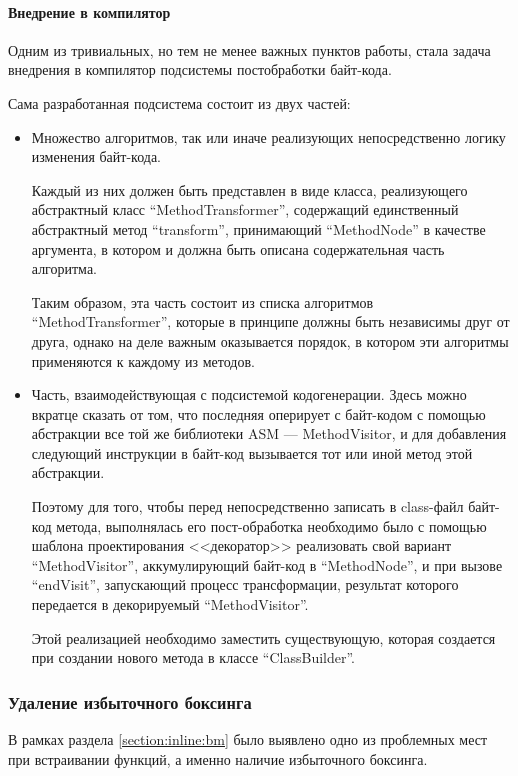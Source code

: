 \paragraph{Внедрение в компилятор}
Одним из тривиальных, но тем не менее важных пунктов работы, стала задача внедрения в компилятор
подсистемы постобработки байт-кода.

Сама разработанная подсистема состоит из двух частей:
\begin{itemize}
    \item Множество алгоритмов, так или иначе реализующих непосредственно логику изменения
    байт-кода.

    Каждый из них должен быть представлен в виде класса, реализующего абстрактный класс
    ``MethodTransformer'', содержащий единственный абстрактный метод ``transform'', принимающий
    ``MethodNode'' в качестве аргумента, в котором и должна быть описана содержательная часть
    алгоритма.

    Таким образом, эта часть состоит из списка алгоритмов ``MethodTransformer'', которые в принципе
    должны быть независимы друг от друга, однако на деле важным оказывается порядок, в котором
    эти алгоритмы применяются к каждому из методов.

    \item Часть, взаимодействующая с подсистемой кодогенерации.
    Здесь можно вкратце сказать от том, что последняя оперирует с байт-кодом с помощью абстракции
    все той же библиотеки ASM --- MethodVisitor, и для добавления следующий инструкции в байт-код
    вызывается тот или иной метод этой абстракции.

    Поэтому для того, чтобы перед непосредственно записать в class-файл байт-код метода,
    выполнялась его пост-обработка необходимо было с помощью шаблона проектирования
    <<декоратор>>\cite{Gamma} реализовать свой вариант ``MethodVisitor'', аккумулирующий байт-код
    в ``MethodNode'', и при вызове ``endVisit'', запускающий процесс трансформации, результат
    которого передается в декорируемый ``MethodVisitor''.

    Этой реализацией необходимо заместить существующую, которая создается при создании нового метода
    в классе ``ClassBuilder''.
\end{itemize}

\subsubsection{Удаление избыточного боксинга}
\label{section:boxing}
В рамках раздела \ref{section:inline:bm} было выявлено одно из проблемных мест при встраивании
функций, а именно наличие избыточного боксинга.

